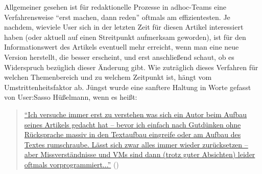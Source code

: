 \documentclass[fontsize=12pt]{scrartcl}
\begin{document}
Allgemeiner gesehen ist f\"ur redaktionelle Prozesse in adhoc-Teams eine Ver\-fah\-rens\-wei\-se "`erst machen, dann reden"' oftmals am effizientesten. Je nachdem, wieviele \mbox{User} sich in der letzten Zeit f\"ur diesen Artikel interessiert haben (oder aktuell auf einen Streit\-punkt aufmerksam geworden), ist f\"ur den Informationswert des Artikels eventuell mehr erreicht, wenn man eine neue Version herstellt, die besser erscheint, und erst anschlie{\ss}end schaut, ob es Widerspruch bez\"uglich dieser \"Anderung gibt. Wie zutr\"aglich dieses Verfahren f\"ur welchen Themenbereich und zu welchem Zeitpunkt ist, h\"angt vom Umstrittenheitsfaktor ab. J\"ungst wurde eine sanftere Haltung in Worte gefasst von \mbox{User}:Sasso H\"u{\ss}elmann, wenn es hei{\ss}t: 

\singlespacing
\begin{quote}
\href{https://de.wikipedia.org/w/index.php?title=Diskussion:Stimmungen_lesen._\%C3\%9Cber_eine_verdeckte_Wirklichkeit_der_Literatur\&diff=next\&oldid=139801823}{"`Ich versuche immer erst zu verstehen was sich ein Autor beim Aufbau seines Artikels gedacht hat -- bevor ich einfach nach Gutd\"unken ohne R\"ucksprache massiv in den Textaufbau eingreife oder am Aufbau des Textes rumschraube. L\"asst sich zwar alles immer wieder zur\"ucksetzen -- aber Missverst\"andnisse und VMs sind dann (trotz guter Absichten) leider oftmals vorprogrammiert..."'} (\cite{UserSalmanSasso2015})
\end{quote}
\onehalfspacing
\end{document}
